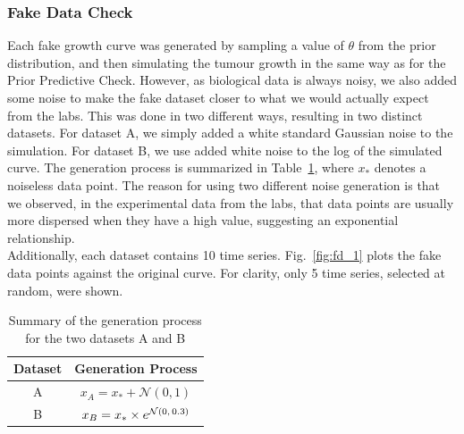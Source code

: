 \documentclass[11pt]{article}
\begin{document}
\subsubsection{Fake Data Check}
Each fake growth curve was generated by sampling a value of $\theta$ from the prior distribution, and then simulating the tumour growth in the same way as for the Prior Predictive Check. However, as biological data is always noisy, we also added some noise to make the fake dataset closer to what we would actually expect from the labs. This was done in two different ways, resulting in two distinct datasets. For dataset A, we simply added a white standard Gaussian noise to the simulation. For dataset B, we use added white noise to the log of the simulated curve. The generation process is summarized in Table~\ref{tbl:genproc}, where $x_*$ denotes a noiseless data point. The reason for using two different noise generation is that we observed, in the experimental data from the labs, that data points are usually more dispersed when they have a high value, suggesting an exponential relationship. \\ 
Additionally, each dataset contains 10 time series. Fig.~\ref{fig:fd_1} plots the fake data points against the original curve. For clarity, only 5 time series, selected at random, were shown.
\begin{table}[h!]
    \centering
    \caption{Summary of the generation process for the two datasets A and B}
    \begin{tabular}{c|c}
        \hline
        Dataset & Generation Process \\ \hline 
        A       & $x_A=x_*+\mathcal{N}(0,1)$ \\
        B       & $x_B=x_*\times e^{\mathcal{N}(0,\hspace{1.5px}0.3)}$ \\ \hline
    \end{tabular}
    \label{tbl:genproc}
\end{table}
\end{document}
